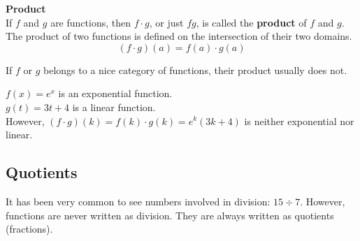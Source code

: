 \documentclass{ximera}
\begin{document}
\begin{template}  \textbf{\textcolor{blue!55!black}{Product}} \\


If  $f$ and $g$ are functions, then $f \cdot g$, or just $f g$, is called the \textbf{\textcolor{green!50!black}{product}} of $f$ and $g$. \\

The product of two functions is defined on the intersection of their two domains. \\


\[ (f \cdot g)(a) = f(a) \cdot g(a)  \]



\end{template}



\begin{warning}

If $f$ or $g$ belongs to a nice category of functions, their product usually does not.

\end{warning}





\begin{example}

$f(x) = e^x$ is an exponential function. \\
$g(t) = 3 t + 4$ is a linear function. \\

However, $(f \cdot g)(k) = f(k) \cdot g(k) = e^k (3 k + 4)$ is neither exponential nor linear.

\end{example}























\subsection{Quotients}



It has been very common to see numbers involved in division: $15 \div 7$. However, functions are never written as division. They are always written as quotients (fractions).
\end{document}
